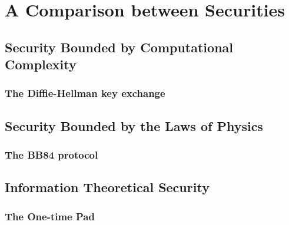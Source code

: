
\lipsum[3]

\section{A Comparison between Securities}

	\subsection{Security Bounded by Computational Complexity}
	
		\subsubsection{The Diffie-Hellman key exchange}
	
	\subsection{Security Bounded by the Laws of Physics}
	
		\subsubsection{The BB84 protocol}
	
	\subsection{Information Theoretical Security}
	
		\subsubsection{The One-time Pad}
